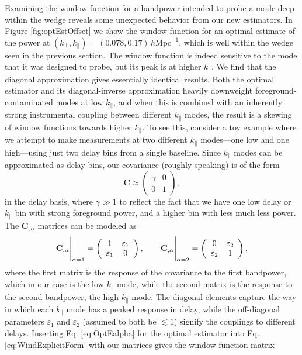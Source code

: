 \documentclass[twocolumn,aps,prd,nofootinbib,showpacs]{revtex4-1}
\begin{document}
Examining the window function for a bandpower intended to probe a mode deep within the wedge reveals some unexpected behavior from our new estimators.  In Figure \ref{fig:optEstOffset} we show the window function for an optimal estimate of the power at $(k_\perp, k_\parallel) = (0.078, 0.17)\,h\textrm{Mpc}^{-1}$, which is well within the wedge seen in the previous section.  The window function is indeed sensitive to the mode that it was designed to probe, but its peak is at higher $k_\parallel$.  We find that the diagonal approximation gives essentially identical results.  Both the optimal estimator and its diagonal-inverse approximation heavily downweight foreground-contaminated modes at low $k_\parallel$, and when this is combined with an inherently strong instrumental coupling between different $k_\parallel$ modes, the result is a skewing of window functions towards higher $k_\parallel$.  To see this, consider a toy example where we attempt to make measurements at two different $k_\parallel$ modes---one low and one high---using just two delay bins from a single baseline.  Since $k_\parallel$ modes can be approximated as delay bins, our covariance (roughly speaking) is of the form
\begin{equation}
\mathbf{C} \approx \left( \begin{array}{cc}
\gamma & 0 \\
0 & 1
\end{array}
\right),
\end{equation}
in the delay basis, where $\gamma \gg 1$ to reflect the fact that we have one low delay or $k_\parallel$ bin with strong foreground power, and a higher bin with less much less power.  The $\mathbf{C}_{,\alpha}$ matrices can be modeled as
\begin{equation}
\mathbf{C}_{,\alpha} \Bigg{|}_{\alpha = 1} = \left( \begin{array}{cc}
1 & \varepsilon_1 \\
\varepsilon_1 & 0
\end{array}
\right), \qquad 
\mathbf{C}_{,\alpha} \Bigg{|}_{\alpha = 2} = \left( \begin{array}{cc}
0 & \varepsilon_2 \\
\varepsilon_2 & 1
\end{array}
\right),
\end{equation}
where the first matrix is the response of the covariance to the first bandpower, which in our case is the low $k_\parallel$ mode, while the second matrix is the response to the second bandpower, the high $k_\parallel$ mode.  The diagonal elements capture the way in which each $k_\parallel$ mode has a peaked response in delay, while the off-diagonal parameters $\varepsilon_1$ and $\varepsilon_2$ (assumed to both be $\lesssim 1$) signify the couplings to different delays.  Inserting Eq. \eqref{eq:OptEalpha} for the optimal estimator into Eq. \eqref{eq:WindExplicitForm} with our matrices gives the window function matrix
\end{document}
